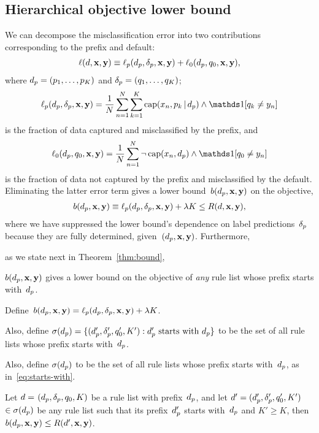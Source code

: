 \subsection{Hierarchical objective lower bound}
\label{sec:hierarchical}

We can decompose the misclassification error into two contributions
corresponding to the prefix and default:
\begin{align}
\Loss(\RL, \x, \y) %
\equiv \Loss_p(\Prefix, \Labels, \x, \y) + \Loss_0(\Prefix, \Default, \x, \y),
\end{align}
where ${d_p = (p_1, \dots, p_K)}$ and ${\delta_p = (q_1, \dots, q_K)}$;
\begin{align}
\Loss_p(\Prefix, \Labels, \x, \y) =
\frac{1}{N} \sum_{n=1}^N \sum_{k=1}^K \Cap(x_n, p_k \given \Prefix) \wedge \one [ q_k \neq y_n ]
\label{eq:loss}
\end{align}
is the fraction of data captured and misclassified by the prefix, and
\begin{align}
\Loss_0(\Prefix, \Default, \x, \y) =
\frac{1}{N} \sum_{n=1}^N \neg\, \Cap(x_n, \Prefix) \wedge \one [ \Default \neq y_n ]
\end{align}
is the fraction of data not captured by the prefix and misclassified by the default.
%
Eliminating the latter error term gives a lower bound~$b(d_p, \mathbf{x}, \mathbf{y})$ on the objective,
\begin{align}
b(\Prefix, \x, \y) \equiv \Loss_p(\Prefix, \Labels, \x, \y) + \Reg K \le \Obj(\RL, \x, \y),
\label{eq:lower-bound}
\end{align}
where we have suppressed the lower bound's dependence on label predictions~$\delta_p$
because they are fully determined, given~${(d_p, \mathbf{x}, \mathbf{y})}$.
%
Furthermore,
\begin{arxiv}
as we state next in Theorem~\ref{thm:bound},
\end{arxiv}
$b(d_p, \mathbf{x}, \mathbf{y})$ gives a lower bound on the objective of
\emph{any} rule list whose prefix starts with~$d_p$.

\begin{theorem}
Define~${b(d_p, \mathbf{x}, \mathbf{y}) = \ell_p(d_p, \delta_p, \mathbf{x}, \mathbf{y}) + {\lambda} K}$.
%
\begin{arxiv}
Also, define
${\sigma(d_p) = \{(d_p', \delta_p', q_0', K') : d_p' \textnormal{ starts with } d_p \}}$
to be the set of all rule lists whose prefix starts with~$d_p$.
\end{arxiv}
\begin{kdd}
Also, define $\sigma(d_p)$
to be the set of all rule lists whose prefix starts with~$d_p$,
as in~\eqref{eq:starts-with}.
\end{kdd}
%
Let ${{d} = }$ ${(d_p, \delta_p, q_0, K)}$ be a rule list
with prefix~$d_p$, and let
${{d}' = (d_p', \delta_p', q_0', K')}$ $\in \sigma(d_p)$
be any rule list such that its prefix~$d_p'$ starts with~$d_p$
and ${K' \ge K}$, then ${b(d_p, \mathbf{x}, \mathbf{y}) \le R({d}', \mathbf{x}, \mathbf{y})}$.
\label{thm:bound}
\end{theorem}


